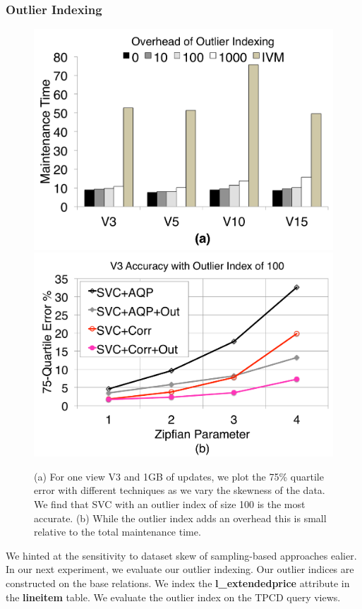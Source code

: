 \subsubsection{Outlier Indexing}

\begin{figure}[t]
\centering
 \includegraphics[scale=0.14]{exp/msoi_1.pdf}
 \includegraphics[scale=0.14]{exp/msoi_2.pdf}
 \caption{(a) For one view V3 and 1GB of updates, we plot the 75\% quartile error with different techniques as we vary the skewness of the data. We find that SVC with an outlier index of size 100 is the most accurate. (b) While the outlier index adds an overhead this is small relative to the total maintenance time. \label{exp5-oi}}
\end{figure}
We hinted at the sensitivity to dataset skew of sampling-based approaches ealier.
In our next experiment, we evaluate our outlier indexing.
Our outlier indices are constructed on the base relations.
We index the \textbf{l\_extendedprice} attribute in the \textbf{lineitem} table.
We evaluate the outlier index on the TPCD query views.

